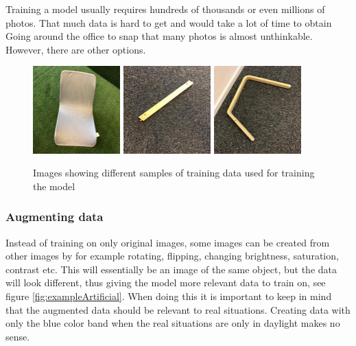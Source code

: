 Training a model usually requires hundreds of thousands or even millions of photos. That much data is hard to get and would take a lot of time to obtain Going around the office to snap that many photos is almost unthinkable.
However, there are other options.

\begin{figure}[hbtp]
\begin{center}
\includegraphics[width = 0.3\textwidth]{./Images/image_31.jpg}
\includegraphics[width = 0.3\textwidth]{./Images/image_133.jpg}
\includegraphics[width = 0.3\textwidth]{./Images/image_136.jpg}

\caption{Images showing different samples of training data used for training the model}
\label{fig:exampleData}
\end{center}
\end{figure}

\subsubsection{Augmenting data}
Instead of training on only original images, some images can be created from other images by for example rotating, flipping, changing brightness, saturation, contrast etc.  This will essentially be an image of the same object, but the data will look different, thus giving the model more relevant data to train on, see figure \ref{fig:exampleArtificial}.
When doing this it is important to keep in mind that the augmented data should be relevant to real situations.
Creating data with only the blue color band when the real situations are only in daylight makes no sense.

